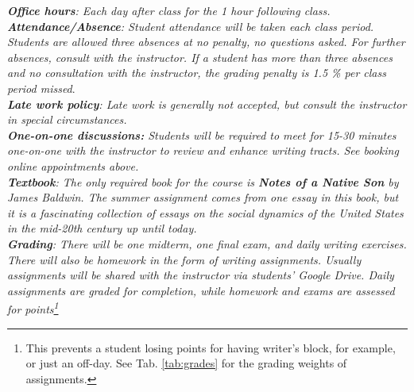\documentclass[10pt]{article}
\begin{document}
\textit{\textbf{Office hours}: Each day after class for the 1 hour following class.} \\
\textit{\textbf{Attendance/Absence}: Student attendance will be taken each class period.  Students are allowed three absences at no penalty, no questions asked.  For further absences, consult with the instructor.  If a student has more than three absences and no consultation with the instructor, the grading penalty is 1.5 \% per class period missed}.\\ 
\textit{\textbf{Late work policy}: Late work is generally not accepted, but consult the instructor in special circumstances.} \\
\textit{\textbf{One-on-one discussions:} Students will be required to meet for 15-30 minutes one-on-one with the instructor to review and enhance writing tracts.  See booking online appointments above.} \\
\textit{\textbf{Textbook}: The only required book for the course is \textit{\textbf{Notes of a Native Son} by James Baldwin}.  The summer assignment comes from one essay in this book, but it is a fascinating collection of essays on the social dynamics of the United States in the mid-20th century up until today.} \\
\textit{\textbf{Grading}: There will be one midterm, one final exam, and daily writing exercises.  There will also be homework in the form of writing assignments.  Usually assignments will be shared with the instructor via students' Google Drive.  Daily assignments are graded for completion, while homework and exams are assessed for points\footnote{This prevents a student losing points for having writer's block, for example, or just an off-day.  See Tab. \ref{tab:grades} for the grading weights of assignments.}} \\
\end{document}
